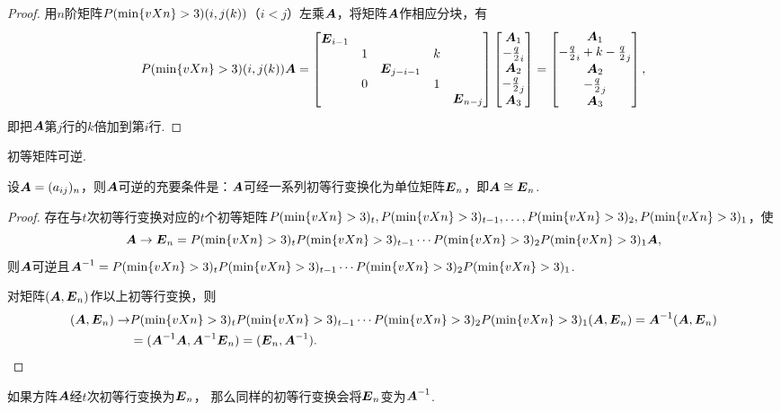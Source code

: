\begin{property}
\begin{proof}
用\(n\)阶矩阵\(\P(i,j(k))\)（\(i < j\)）左乘\(\A\)，将矩阵\(\A\)作相应分块，有\[
\P(i,j(k)) \A = \begin{bmatrix}
\E_{i-1} \\
& 1 & & k \\
& & \E_{j-i-1} \\
& 0 & & 1 \\
& & & & \E_{n-j}
\end{bmatrix} \begin{bmatrix}
\A_1 \\ \a_i \\ \A_2 \\ \a_j \\ \A_3
\end{bmatrix} = \begin{bmatrix}
\A_1 \\ \a_i + k \a_j \\ \A_2 \\ \a_j \\ \A_3
\end{bmatrix},
\]即把\(\A\)第\(j\)行的\(k\)倍加到第\(i\)行.
\end{proof}
\end{property}

\begin{property}\label{theorem:逆矩阵.初等矩阵的性质3}
初等矩阵可逆.
\end{property}

\begin{theorem}\label{theorem:逆矩阵.可逆矩阵与初等矩阵的关系}
设\(\A=(a_{ij})_n\)，则\(\A\)可逆的充要条件是：\(\A\)可经一系列初等行变换化为单位矩阵\(\E_n\)，即\(\A \cong \E_n\).
\begin{proof}
\def\Ps{\P_t \P_{t-1} \dotsm \P_2 \P_1}
存在与\(t\)次初等行变换对应的\(t\)个初等矩阵\(\P_t,\P_{t-1},\dotsc,\P_2,\P_1\)，使\[
\A \to \E_n = \Ps \A,
\]则\(\A\)可逆且\(\A^{-1} = \Ps\).

对矩阵\((\A,\E_n)\)作以上初等行变换，则\begin{align*}
(\A,\E_n) \to &\Ps(\A,\E_n) = \A^{-1}(\A,\E_n) \\
&= (\A^{-1}\A,\A^{-1}\E_n) = (\E_n,\A^{-1}).
\qedhere
\end{align*}
\end{proof}
\end{theorem}

\begin{corollary}\label{theorem:逆矩阵.计算逆矩阵的方法}
如果方阵\(\A\)经\(t\)次初等行变换为\(\E_n\)，%
那么同样的初等行变换会将\(\E_n\)变为\(\A^{-1}\).
\end{corollary}

